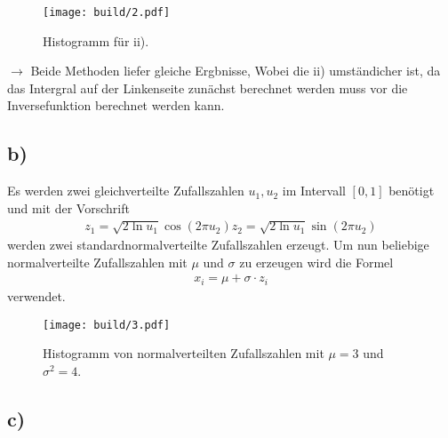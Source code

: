 \begin{figure}
  \texttt{[image: build/2.pdf]}
  \caption{Histogramm für ii).}
\end{figure}

$\rightarrow$ Beide Methoden liefer gleiche Ergbnisse, Wobei die ii) umständicher
ist, da das Intergral auf der Linkenseite zunächst berechnet werden muss vor die Inversefunktion
berechnet werden kann.


\subsection*{b)}
Es werden zwei gleichverteilte Zufallszahlen $u_1,u_2$ im Intervall $[0,1]$
benötigt und mit der Vorschrift
\begin{align}
  z_1=\sqrt{2\ln u_1}\cos(2\pi u_2)
  z_2=\sqrt{2\ln u_1}\sin(2\pi u_2)
\end{align}
werden zwei standardnormalverteilte
Zufallszahlen erzeugt.
Um nun beliebige normalverteilte
Zufallszahlen mit $\mu$ und $\sigma$ zu erzeugen
wird die Formel
\begin{align*}
x_i= \mu +\sigma\cdot z_i
\end{align*}
verwendet.

\begin{figure}
  \texttt{[image: build/3.pdf]}
  \caption{Histogramm von normalverteilten Zufallszahlen mit $\mu=3$ und $\sigma^2=4$.}
\end{figure}


\subsection*{c)}
